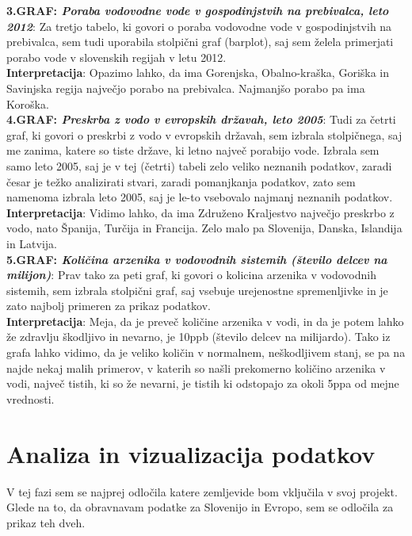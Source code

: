 \documentclass[11pt,a4paper]{article}
\begin{document}
\textbf{3.GRAF: \emph{Poraba vodovodne vode v gospodinjstvih na prebivalca, leto 2012}}: Za tretjo tabelo, ki govori o poraba vodovodne vode v gospodinjstvih na prebivalca, sem tudi uporabila stolpični graf (barplot), saj sem želela primerjati porabo vode v slovenskih regijah v letu 2012. \\
\textbf{Interpretacija}: Opazimo lahko, da ima Gorenjska, Obalno-kraška, Goriška in Savinjska regija največjo porabo na prebivalca. Najmanjšo porabo pa ima Koroška.\\

\textbf{4.GRAF: \emph{Preskrba z vodo v evropskih državah, leto 2005}}: Tudi za četrti graf, ki govori o preskrbi z vodo v evropskih državah, sem izbrala stolpičnega, saj me zanima, katere so tiste države, ki letno največ porabijo vode. Izbrala sem samo leto 2005, saj je v tej (četrti) tabeli zelo veliko neznanih podatkov, zaradi česar je težko analizirati stvari, zaradi pomanjkanja podatkov, zato sem namenoma izbrala leto 2005, saj je le-to vsebovalo najmanj neznanih podatkov.\\
\textbf{Interpretacija}: Vidimo lahko, da ima Združeno Kraljestvo največjo preskrbo z vodo, nato Španija, Turčija in Francija. Zelo malo pa Slovenija, Danska, Islandija in Latvija.\\

\textbf{5.GRAF: \emph{Količina arzenika v vodovodnih sistemih (število delcev na milijon)}}: Prav tako za peti graf, ki govori o kolicina arzenika v vodovodnih sistemih, sem izbrala stolpični graf, saj vsebuje urejenostne spremenljivke in je zato najbolj primeren za prikaz podatkov.\\
\textbf{Interpretacija}: Meja, da je preveč količine arzenika v vodi, in da je potem lahko že zdravlju škodljivo in nevarno, je 10ppb (število delcev na milijardo). Tako iz grafa lahko vidimo, da je veliko količin v normalnem, neškodljivem stanj, se pa na najde nekaj malih primerov, v katerih so našli prekomerno količino arzenika v vodi, največ tistih, ki so že nevarni, je tistih ki odstopajo za okoli 5ppa od mejne vrednosti.\\



\section{Analiza in vizualizacija podatkov}

V tej fazi sem se najprej odločila katere zemljevide bom vključila v svoj projekt. Glede na to, da obravnavam podatke za Slovenijo in Evropo, sem se odločila za prikaz teh dveh.
\vspace{5mm} 
\end{document}
